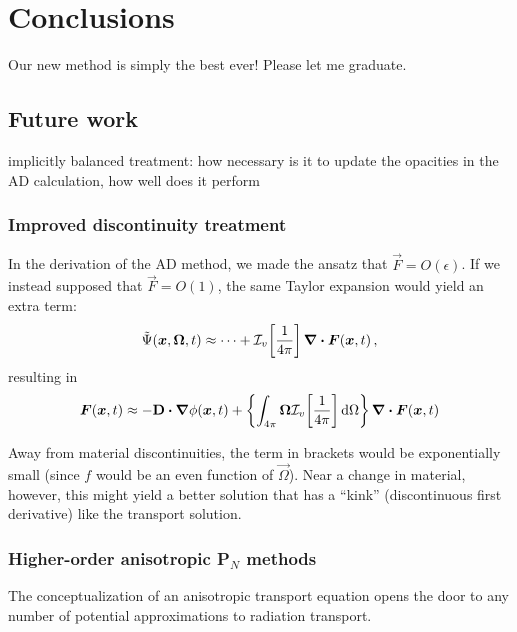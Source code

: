 
\chapter{Conclusions}\label{chap:conclusion}

Our new method is simply the best ever! Please let me graduate.

\section{Future work}

implicitly balanced treatment: how necessary is it to update the opacities in
the AD calculation, how well does it perform

\subsection{Improved discontinuity treatment}
In the derivation of the AD method, we made the ansatz that
$\vec{F}=O(\epsilon)$. If we instead supposed that $\vec{F}=O(1)$, the same
Taylor expansion would yield an extra term:
\begin{equation*}
  \tilde\Psi(\bm{x}, \bm{\Omega}, t)
  \approx \cdots + \mathcal{I}_{v}\!\left[ \frac1{4\pi} \right] \bm{\nabla} \bm{\cdot} \bm{F}(\bm{x},t)\,,
\end{equation*}
resulting in
\begin{equation*}
  \bm{F}(\bm{x}, t)
  \approx - \mathbf{D} \bm{\cdot} \bm{\nabla} \phi(\bm{x},t)
  + \left\{ \int_{4\pi} \bm{\Omega} \mathcal{I}_{v}\!\left[ \frac1{4\pi} \right] \mathop{}\!\mathrm{d}\Omega
  \right\} \bm{\nabla} \bm{\cdot} \bm{F}(\bm{x},t)
\end{equation*}

Away from material discontinuities, the term in brackets would be
exponentially small (since $f$ would be an even function of $\vec{\Omega}$).
Near a change in material, however, this might yield a better solution that has
a ``kink'' (discontinuous first derivative) like the transport solution.

\subsection{Higher-order anisotropic P$_N$ methods}
The conceptualization of an anisotropic transport equation opens the door to
any number of potential approximations to radiation transport.

